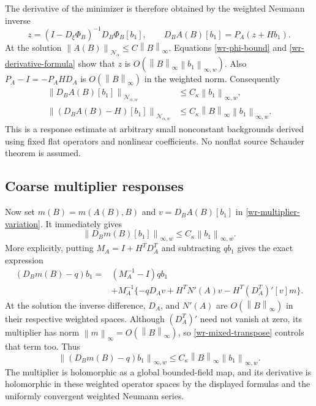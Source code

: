 \documentclass[11pt]{article}
\theoremstyle{remark}
\newcommand{\norm}[1]{\left\|#1\right\|}
\begin{document}
The derivative of the minimizer is therefore obtained by the
weighted Neumann inverse
\begin{equation}\label{wr-derivative-formula}
 z=(I-D_\xi\Phi_B)^{-1}D_B\Phi_B[b_1],\qquad
 D_BA(B)[b_1]=P_A(z+Hb_1).
\end{equation}
At the solution $\norm{A(B)}_{\mathcal N_\alpha}
\le C\norm{B}_\infty$. Equations \eqref{wr-phi-bound} and
\eqref{wr-derivative-formula} show that $z$ is
$O(\norm{B}_\infty\norm{b_1}_{\infty,w})$.
Also $P_A-I=-P_AHD_A$ is $O(\norm{B}_\infty)$ in the
weighted norm. Consequently
\begin{equation}\label{wr-main-response}
 \boxed{\begin{aligned}
 \norm{D_BA(B)[b_1]}_{\mathcal N_{\alpha,w}}
 &\le C_\kappa\norm{b_1}_{\infty,w},\\
 \norm{(D_BA(B)-H)[b_1]}_{\mathcal N_{\alpha,w}}
 &\le C_\kappa\norm{B}_\infty\norm{b_1}_{\infty,w}.
 \end{aligned}}
\end{equation}
This is a response estimate at arbitrary small nonconstant
backgrounds derived using fixed flat operators and nonlinear
coefficients. No nonflat source Schauder theorem is assumed.

\subsection{Coarse multiplier responses}
\label{wr-multiplier-responses}

Now set $m(B)=m(A(B),B)$ and
$v=D_BA(B)[b_1]$ in \eqref{wr-multiplier-variation}. It immediately
gives
\begin{equation}\label{wr-dm-bound}
 \norm{D_Bm(B)[b_1]}_{\infty,w}
 \le C_\kappa\norm{b_1}_{\infty,w}.
\end{equation}
More explicitly, putting $M_A=I+H^TD_A^T$ and subtracting
$qb_1$ gives the exact expression
\begin{equation}\label{wr-dm-remainder}
 \begin{split}
 (D_Bm(B)-q)b_1={}&(M_A^{-1}-I)qb_1\\
 &+M_A^{-1}\{-qD_Av+H^TN'(A)v-H^T(D_A^T)'[v]m\}.
 \end{split}
\end{equation}
At the solution the inverse difference, $D_A$, and $N'(A)$
are $O(\norm{B}_\infty)$ in their respective weighted spaces.
Although $(D_A^T)'$ need not vanish at zero, its multiplier
has norm $\norm{m}_\infty=O(\norm{B}_\infty)$, so
\eqref{wr-mixed-transpose} controls that term too. Thus
\begin{equation}\label{wr-dm-near-q}
 \boxed{\quad
 \norm{(D_Bm(B)-q)b_1}_{\infty,w}
 \le C_\kappa\norm{B}_\infty\norm{b_1}_{\infty,w}.
 \quad}
\end{equation}
The multiplier is holomorphic as a global bounded-field map,
and its derivative is holomorphic in these weighted operator
spaces by the displayed formulas and the uniformly convergent
weighted Neumann series.
\end{document}
